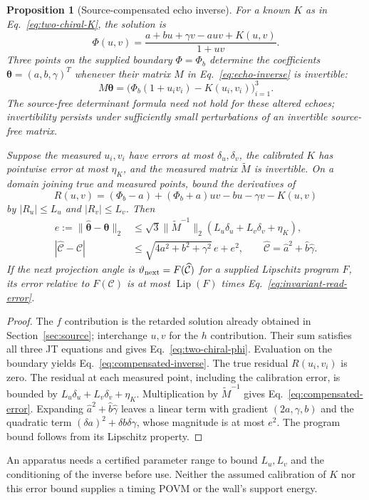 \documentclass[12pt,a4paper]{article}
\newtheorem{proposition}[theorem]{Proposition}
\begin{document}
\begin{proposition}[Source-compensated echo inverse]\label{prop:compensated-echo}
For a known $K$ as in Eq.~\eqref{eq:two-chiral-K}, the solution is
\begin{equation}\label{eq:two-chiral-phi}
 \Phi(u,v)=\frac{a+bu+\gamma v-auv+K(u,v)}{1+uv}.
\end{equation}
Three points on the supplied boundary $\Phi=\Phi_b$ determine the coefficients
$\boldsymbol\theta=(a,b,\gamma)^T$ whenever their matrix $M$ in
Eq.~\eqref{eq:echo-inverse} is invertible:
\begin{equation}\label{eq:compensated-inverse}
 M\boldsymbol\theta=
 \bigl(\Phi_b(1+u_iv_i)-K(u_i,v_i)\bigr)_{i=1}^3.
\end{equation}
The source-free determinant formula need not hold for these altered echoes;
invertibility persists under sufficiently small perturbations of an invertible
source-free matrix.

Suppose the measured $u_i,v_i$ have errors at most $\delta_u,\delta_v$,
the calibrated $K$ has pointwise error at most $\eta_K$, and the measured
matrix $\widetilde M$ is invertible. On a domain joining true and measured points,
bound the derivatives of
\[
 R(u,v)=(\Phi_b-a)+(\Phi_b+a)uv-bu-\gamma v-K(u,v)
\]
by $|R_u|\le L_u$ and $|R_v|\le L_v$. Then
\begin{align}
 e:=\|\widehat{\boldsymbol\theta}-\boldsymbol\theta\|_2
 &\le\sqrt3\|\widetilde M^{-1}\|_2
       (L_u\delta_u+L_v\delta_v+\eta_K),\label{eq:compensated-error}\\
 |\widehat{\mathcal C}-\mathcal C|
 &\le\sqrt{4a^2+b^2+\gamma^2}\,e+e^2,
 \qquad \widehat{\mathcal C}=\widehat a^2+\widehat b\widehat\gamma.
 \label{eq:invariant-read-error}
\end{align}
If the next projection angle is $\vartheta_{\rm next}=F(\widehat{\mathcal C})$
for a supplied Lipschitz program $F$, its error relative to $F(\mathcal C)$ is
at most $\operatorname{Lip}(F)$ times Eq.~\eqref{eq:invariant-read-error}.
\end{proposition}
\begin{proof}
The $f$ contribution is the retarded solution already obtained in
Section~\ref{sec:source}; interchange $u,v$ for the $h$ contribution. Their
sum satisfies all three JT equations and gives Eq.~\eqref{eq:two-chiral-phi}.
Evaluation on the boundary yields Eq.~\eqref{eq:compensated-inverse}.
The true residual $R(u_i,v_i)$ is zero. The residual at each measured point,
including the calibration error, is bounded by
$L_u\delta_u+L_v\delta_v+\eta_K$. Multiplication by
$\widetilde M^{-1}$ gives Eq.~\eqref{eq:compensated-error}. Expanding
$\widehat a^2+\widehat b\widehat\gamma$ leaves a linear term with gradient
$(2a,\gamma,b)$ and the quadratic term
$(\delta a)^2+\delta b\delta\gamma$, whose magnitude is at most $e^2$.
The program bound follows from its Lipschitz property.
\end{proof}
An apparatus needs a certified parameter range to bound $L_u,L_v$ and the
conditioning of the inverse before use. Neither the assumed calibration of $K$
nor this error bound supplies a timing POVM or the wall's support energy.
\end{document}
